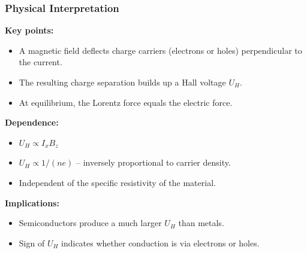 \begin{frame}
	\frametitle{Physical Interpretation}
    \small
    \textbf{Key points:}
    \begin{itemize}
        \item A magnetic field deflects charge carriers (electrons or holes) perpendicular to the current.
        \item The resulting charge separation builds up a Hall voltage $U_H$.
        \item At equilibrium, the Lorentz force equals the electric force.
    \end{itemize}
    \textbf{Dependence:}
    \begin{itemize}
        \item $U_H \propto I_x B_z$
        \item $U_H \propto 1 / (n e)$ -- inversely proportional to carrier density.
        \item Independent of the specific resistivity of the material.
    \end{itemize}
    \textbf{Implications:}
    \begin{itemize}
        \item Semiconductors produce a much larger $U_H$ than metals.
        \item Sign of $U_H$ indicates whether conduction is via electrons or holes.
    \end{itemize}
\end{frame}

